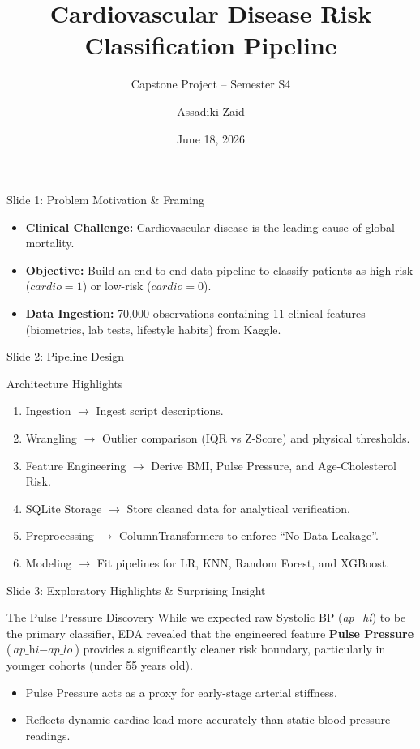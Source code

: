 \documentclass{beamer}
\title[CVD Risk Classification]{Cardiovascular Disease Risk Classification Pipeline}
\subtitle{Capstone Project -- Semester S4}
\author{Assadiki Zaid}
\institute{École Hassania des Travaux Publics (EHTP)}
\date{June 18, 2026}
\begin{document}
\frame{\titlepage}

\begin{frame}{Slide 1: Problem Motivation \& Framing}
    \begin{itemize}
        \item \textbf{Clinical Challenge:} Cardiovascular disease is the leading cause of global mortality.
        \item \textbf{Objective:} Build an end-to-end data pipeline to classify patients as high-risk ($cardio=1$) or low-risk ($cardio=0$).
        \item \textbf{Data Ingestion:} 70,000 observations containing 11 clinical features (biometrics, lab tests, lifestyle habits) from Kaggle.
    \end{itemize}
\end{frame}

\begin{frame}{Slide 2: Pipeline Design}
    \begin{block}{Architecture Highlights}
        \begin{enumerate}
            \item Ingestion $\rightarrow$ Ingest script descriptions.
            \item Wrangling $\rightarrow$ Outlier comparison (IQR vs Z-Score) and physical thresholds.
            \item Feature Engineering $\rightarrow$ Derive BMI, Pulse Pressure, and Age-Cholesterol Risk.
            \item SQLite Storage $\rightarrow$ Store cleaned data for analytical verification.
            \item Preprocessing $\rightarrow$ ColumnTransformers to enforce ``No Data Leakage''.
            \item Modeling $\rightarrow$ Fit pipelines for LR, KNN, Random Forest, and XGBoost.
        \end{enumerate}
    \end{block}
\end{frame}

\begin{frame}{Slide 3: Exploratory Highlights \& Surprising Insight}
    \begin{alertblock}{The Pulse Pressure Discovery}
        While we expected raw Systolic BP (\textit{ap\_hi}) to be the primary classifier, EDA revealed that the engineered feature \textbf{Pulse Pressure} ($\textit{ap\_hi} - \textit{ap\_lo}$) provides a significantly cleaner risk boundary, particularly in younger cohorts (under 55 years old).
    \end{alertblock}
    \begin{itemize}
        \item Pulse Pressure acts as a proxy for early-stage arterial stiffness.
        \item Reflects dynamic cardiac load more accurately than static blood pressure readings.
    \end{itemize}
\end{frame}
\end{document}
